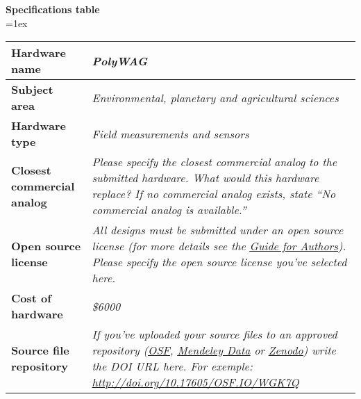 \documentclass[11pt, letterpaper]{article}
\begin{document}
\begin{flushleft}
%
%
\newpage
\textbf{Specifications table}\\
\vskip 0.2cm
\tabulinesep=1ex
\begin{tabu} to \linewidth {|X|X[3,l]|}
\hline  \textbf{Hardware name} & \textit{PolyWAG}
  \\
  \hline \textbf{Subject area} & %
  \textit{Environmental, planetary and agricultural sciences}
  \\
  \hline \textbf{Hardware type} &
    \textit{Field measurements and sensors}
  \\ 
\hline \textbf{Closest commercial analog} &
  \textit{Please specify the closest commercial analog to the submitted hardware. What would this hardware replace? If no commercial analog exists, state “No commercial analog is available.”}
  \\
\hline \textbf{Open source license} &
  {\it All designs must be submitted under an open source license (for more details see the \href{https://www.elsevier.com/journals/hardwarex/2468-0672/guide-for-authors}{\underline{Guide for Authors}}). Please specify the open source license you’ve selected here. }
  \\
\hline \textbf{Cost of hardware} &
  \textit{\$6000}
  \\
\hline \textbf{Source file repository} & 
  \textit{If you’ve uploaded your source files to an approved repository (\href{http://osf.io}{\underline{OSF}}, \href{https://data.mendeley.com/}{\underline{Mendeley Data}} or \href{https://zenodo.org/}{\underline{Zenodo}}) write the DOI URL here. For exemple:  \href{http://doi.org/10.17605/OSF.IO/WGK7Q}{http://doi.org/10.17605/OSF.IO/WGK7Q}}  

\end{tabu}
\end{flushleft}
\end{document}

